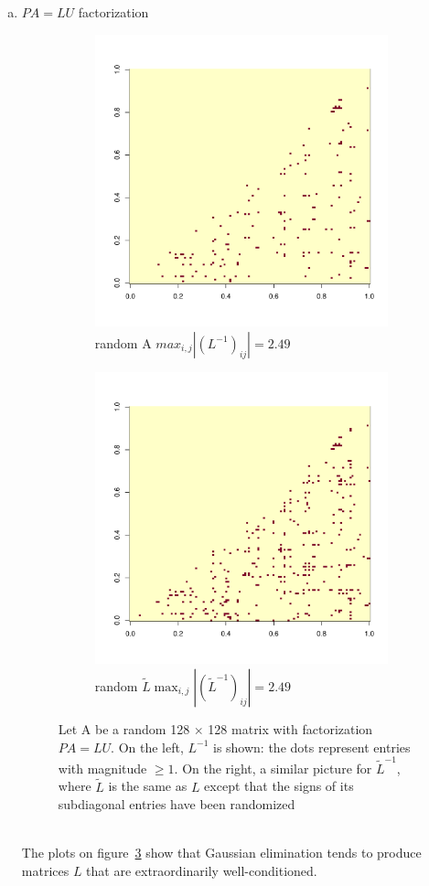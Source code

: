 \documentclass[11pt]{article}
\begin{document}
\begin{enumerate}[(a)]
\item $PA = LU$ factorization\\
\begin{figure}[h]
\centering
  \begin{subfigure}[b]{0.4\textwidth}
    \begin{center}
    \includegraphics[width=7 cm, clip = false]{Lmatrix1.pdf}
    \caption{random A $ max_{i,j}\left| (L^{-1})_{ij}\right| = 2.49$}
    \label{fig:22.3.a}
    \end{center}
  \end{subfigure}
\hfill
  \begin{subfigure}[b]{0.4\textwidth}
    \centering
    \includegraphics[width = 7 cm]{Lmatrix2.pdf}
    \caption{random $\tilde{L}\max_{i,j} \left| (\tilde{L}^{-1})_{ij}\right| = 2.49$}
    \label{fig:22.3.b}
  \end{subfigure}
 \caption{Let A be a random 128 $\times$ 128 matrix with factorization $PA = LU.$ On the left, $L^{-1}$ is shown: the dots represent entries with magnitude $\geq 1.$ On the right, a similar picture for $\tilde{L}^{-1}$, where $\tilde{L}$ is the same as $L$ except that the signs of its subdiagonal entries have been randomized}\label{fig:22.3}
\end{figure}\\
The plots on figure~\ref{fig:22.3} show that Gaussian elimination tends to produce matrices $L$ that are extraordinarily well-conditioned.


\end{enumerate}
\end{document}
